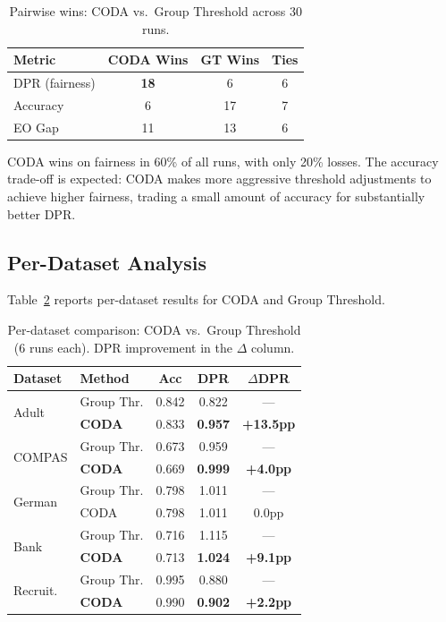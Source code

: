 \documentclass[10pt,twocolumn]{article}
\theoremstyle{definition}
\begin{document}
\begin{table}[t]
\centering
\caption{Pairwise wins: CODA vs.\ Group Threshold across 30 runs.}
\label{tab:wins}
\small
\begin{tabular}{@{}lccc@{}}
\toprule
Metric & CODA Wins & GT Wins & Ties \\
\midrule
DPR (fairness) & \textbf{18} & 6 & 6 \\
Accuracy & 6 & 17 & 7 \\
EO Gap & 11 & 13 & 6 \\
\bottomrule
\end{tabular}
\end{table}

CODA wins on fairness in 60\% of all runs, with only 20\% losses. The accuracy trade-off is expected: CODA makes more aggressive threshold adjustments to achieve higher fairness, trading a small amount of accuracy for substantially better DPR.

\subsection{Per-Dataset Analysis}

Table~\ref{tab:perdataset} reports per-dataset results for CODA and Group Threshold.

\begin{table}[t]
\centering
\caption{Per-dataset comparison: CODA vs.\ Group Threshold (6 runs each). DPR improvement in the $\Delta$ column.}
\label{tab:perdataset}
\small
\begin{tabular}{@{}llccc@{}}
\toprule
Dataset & Method & Acc & DPR & $\Delta$DPR \\
\midrule
\multirow{2}{*}{Adult} & Group Thr. & 0.842 & 0.822 & --- \\
 & \textbf{CODA} & 0.833 & \textbf{0.957} & \textbf{+13.5pp} \\
\midrule
\multirow{2}{*}{COMPAS} & Group Thr. & 0.673 & 0.959 & --- \\
 & \textbf{CODA} & 0.669 & \textbf{0.999} & \textbf{+4.0pp} \\
\midrule
\multirow{2}{*}{German} & Group Thr. & 0.798 & 1.011 & --- \\
 & CODA & 0.798 & 1.011 & 0.0pp \\
\midrule
\multirow{2}{*}{Bank} & Group Thr. & 0.716 & 1.115 & --- \\
 & \textbf{CODA} & 0.713 & \textbf{1.024} & \textbf{+9.1pp} \\
\midrule
\multirow{2}{*}{Recruit.} & Group Thr. & 0.995 & 0.880 & --- \\
 & \textbf{CODA} & 0.990 & \textbf{0.902} & \textbf{+2.2pp} \\
\bottomrule
\end{tabular}
\end{table}
\end{document}
